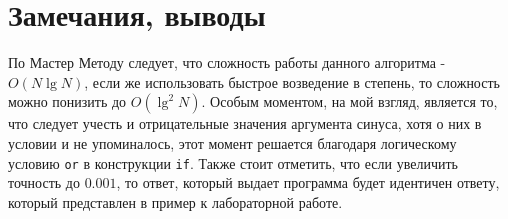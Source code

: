 \documentclass[12pt]{article}
\begin{document}
\section{Замечания, выводы}
По Мастер Методу следует, что сложность работы данного алгоритма - $O(N\lg{N})$, если же использовать быстрое возведение в степень, то сложность можно понизить до $O(\lg^2N)$. Особым моментом, на мой взгляд, является то, что следует учесть и отрицательные значения аргумента синуса, хотя о них в условии и не упоминалось, этот момент решается благодаря логическому условию {\tt or} в конструкции {\tt if}. Также стоит отметить, что если увеличить точность до $0.001$, то ответ, который выдает программа будет идентичен ответу, который представлен в пример к лабораторной работе.
\end{document}
